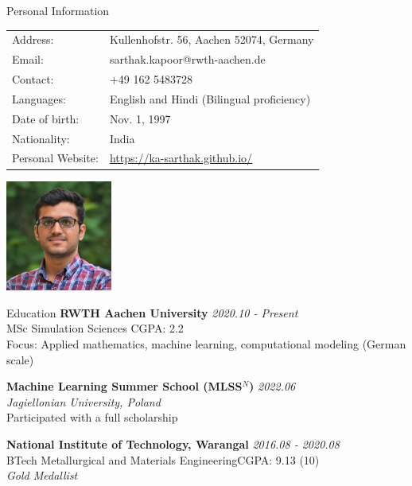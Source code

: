 \documentclass{resume}
\begin{document}
\begin{rSection}{Personal Information}\itemsep -3pt
\begin{multicols}{2}

  \begin{tabular}{|ll}
    Address: & Kullenhofstr. 56, Aachen 52074, Germany \\
    Email: & sarthak.kapoor@rwth-aachen.de \\
    Contact: & +49 162 5483728 \\
    Languages: &  English and Hindi (Bilingual proficiency) \\
    Date of birth: &  Nov. 1, 1997 \\ 
    Nationality: &  India \\
    Personal Website: & \url{https://ka-sarthak.github.io/}\\
  \end{tabular}
  \columnbreak
  \hfill \includegraphics[width=3.5cm]{profile.jpg}

\end{multicols}
\end{rSection}


\begin{rSection}{Education}
{\bf RWTH Aachen University} \hfill {\em 2020.10 - Present}\\
MSc Simulation Sciences \hfill {CGPA: 2.2}\\
Focus: Applied mathematics, machine learning, computational modeling \hfill{(German scale)}

{\bf Machine Learning Summer School (MLSS\(^N\))} \hfill {\em 2022.06}\\
{\em Jagiellonian University, Poland}\\
Participated with a full scholarship

{\bf National Institute of Technology, Warangal} \hfill {\em 2016.08 - 2020.08} \\
BTech Metallurgical and Materials Engineering\hfill {CGPA: 9.13 (10)}\\
\emph{Gold Medallist}
\end{rSection}
\end{document}
